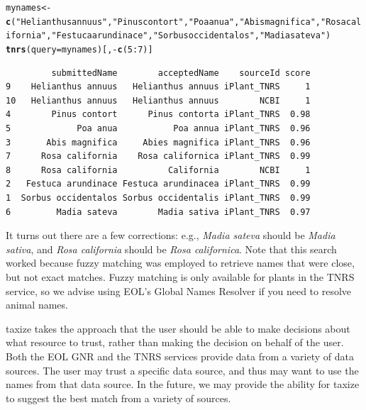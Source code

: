 \documentclass[10pt,a4paper,twocolumn]{article}
\makeatletter
\newcommand{\hlfunctioncall}[1]{\textcolor[rgb]{0.501960784313725,0,0.329411764705882}{\textbf{#1}}}%
\newcommand{\hlstring}[1]{\textcolor[rgb]{0.6,0.6,1}{#1}}%
\newenvironment{kframe}{%
 \def\at@end@of@kframe{}%
 \ifinner\ifhmode%
  \def\at@end@of@kframe{\end{minipage}}%
  \begin{minipage}{\columnwidth}%
 \fi\fi%
 \def\FrameCommand##1{\hskip\@totalleftmargin \hskip-\fboxsep
 \colorbox{shadecolor}{##1}\hskip-\fboxsep
     \hskip-\linewidth \hskip-\@totalleftmargin \hskip\columnwidth}%
 \MakeFramed {\advance\hsize-\width
   \@totalleftmargin\z@ \linewidth\hsize
   \@setminipage}}%
 {\par\unskip\endMakeFramed%
 \at@end@of@kframe}
\newenvironment{knitrout}{}{} %
\makeatother
\begin{document}
\begin{knitrout}
\begin{scriptsize}
\color{fgcolor}\begin{kframe}
\begin{alltt}
mynames <- \hlfunctioncall{c}(\hlstring{"Helianthus annuus"}, \hlstring{"Pinus contort"}, \hlstring{"Poa anua"}, \newline \hlstring{"Abis magnifica"}, \hlstring{"Rosa california"}, \hlstring{"Festuca arundinace"}, \newline \hlstring{"Sorbus occidentalos"}, \hlstring{"Madia sateva"})
\hlfunctioncall{tnrs}(query = mynames)[, -\hlfunctioncall{c}(5:7)]
\end{alltt}
\begin{verbatim}
         submittedName        acceptedName    sourceId score
9    Helianthus annuus   Helianthus annuus iPlant_TNRS     1
10   Helianthus annuus   Helianthus annuus        NCBI     1
4        Pinus contort      Pinus contorta iPlant_TNRS  0.98
5             Poa anua           Poa annua iPlant_TNRS  0.96
3       Abis magnifica     Abies magnifica iPlant_TNRS  0.96
7      Rosa california    Rosa californica iPlant_TNRS  0.99
8      Rosa california          California        NCBI     1
2   Festuca arundinace Festuca arundinacea iPlant_TNRS  0.99
1  Sorbus occidentalos Sorbus occidentalis iPlant_TNRS  0.99
6         Madia sateva        Madia sativa iPlant_TNRS  0.97
\end{verbatim}
\end{kframe}
\end{scriptsize}
\end{knitrout}


It turns out there are a few corrections: e.g., \emph{Madia sateva} should be \emph{Madia sativa}, and \emph{Rosa california} should be \emph{Rosa californica}. Note that this search worked because fuzzy matching was employed to retrieve names that were close, but not exact matches. Fuzzy matching is only available for plants in the TNRS service, so we advise using EOL's Global Names Resolver if you need to resolve animal names.

taxize takes the approach that the user should be able to make decisions about what resource to trust, rather than making the decision on behalf of the user. Both the EOL GNR and the TNRS services provide data from a variety of data sources. The user may trust a specific data source, and thus may want to use the names from that data source. In the future, we may provide the ability for taxize to suggest the best match from a variety of sources.
\end{document}

